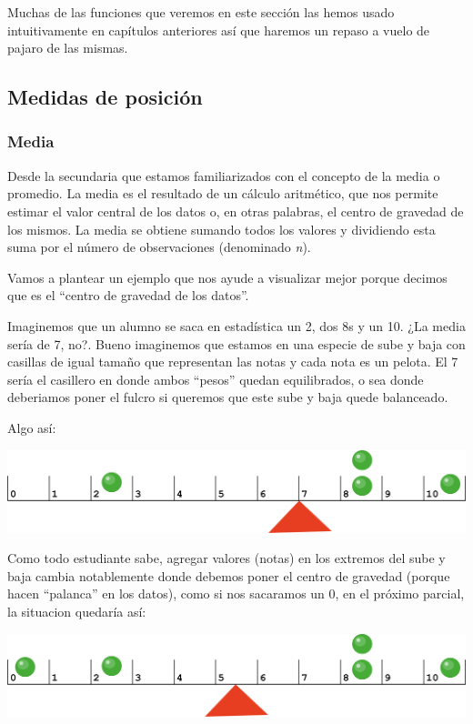\documentclass[
]{book}
\begin{document}
Muchas de las funciones que veremos en este sección las hemos usado intuitivamente en capítulos anteriores así que haremos un repaso a vuelo de pajaro de las mismas.

\hypertarget{medidas-de-posiciuxf3n}{%
\subsection{Medidas de posición}\label{medidas-de-posiciuxf3n}}

\hypertarget{media}{%
\subsubsection{Media}\label{media}}

Desde la secundaria que estamos familiarizados con el concepto de la media o promedio. La media es el resultado de un cálculo aritmético, que nos permite estimar el valor central de los datos o, en otras palabras, el centro de gravedad de los mismos. La media se obtiene sumando todos los valores y dividiendo esta suma por el número de observaciones (denominado \emph{n}).

Vamos a plantear un ejemplo que nos ayude a visualizar mejor porque decimos que es el ``centro de gravedad de los datos''.

Imaginemos que un alumno se saca en estadística un 2, dos 8s y un 10. ¿La media sería de 7, no?. Bueno imaginemos que estamos en una especie de sube y baja con casillas de igual tamaño que representan las notas y cada nota es un pelota. El 7 sería el casillero en donde ambos ``pesos'' quedan equilibrados, o sea donde deberiamos poner el fulcro si queremos que este sube y baja quede balanceado.

Algo así:

\includegraphics[width=45.92in]{img/mean_ruler}

Como todo estudiante sabe, agregar valores (notas) en los extremos del sube y baja cambia notablemente donde debemos poner el centro de gravedad (porque hacen ``palanca'' en los datos), como si nos sacaramos un 0, en el próximo parcial, la situacion quedaría así:

\includegraphics[width=45.92in]{img/mean_ruler_2}
\end{document}
